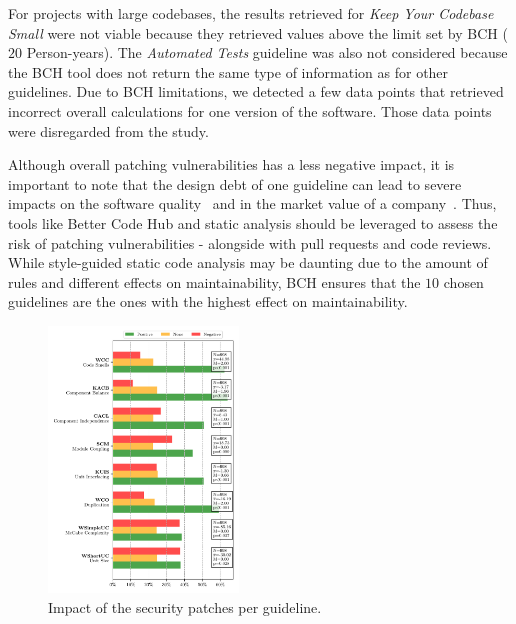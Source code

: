 \documentclass[10pt,conference]{IEEEtran}
\begin{document}
For projects with large codebases, the results retrieved for \emph{Keep Your 
Codebase Small} were not viable because they retrieved values above the limit 
set by BCH ($20$ Person-years). The \emph{Automated Tests} guideline was also 
not considered because the BCH tool does not return the same type of information
as for other guidelines. Due to BCH limitations, we detected a few data points
that retrieved incorrect overall calculations for one version of the software. 
Those data points were disregarded from the study.

Although overall patching vulnerabilities has a less negative impact, it is 
important to note that the design debt of one guideline can lead
to severe impacts on the software quality~\cite{10.1145/1985362.1985366} 
and in the market value of a company~\cite{4267025}. Thus,
tools like Better Code Hub and static analysis should be leveraged to 
assess the risk of patching vulnerabilities - alongside with pull
requests and code reviews. While style-guided static code analysis
may be daunting due to the amount of rules and different effects
on maintainability, BCH ensures that the $10$ chosen guidelines are
the ones with the highest effect on maintainability. 
%
% 
 \begin{figure}[H]
  	\centering
 	\vspace{-0.3 cm}
  	\includegraphics[width=0.45\textwidth]{figures/main_per_guideline.pdf}
 	\vspace{-0.3 cm}
  	\caption{Impact of the security patches per guideline.}
 	\label{fig:guidelines}
 	\vspace{0.2 cm}
 \end{figure}
 
\end{document}
